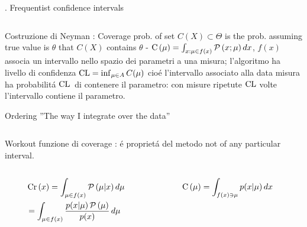\documentclass[asd-beamer.tex]{subfiles}%
\begin{document}
\begin{frame}{. Frequentist confidence intervals}
\begin{columns}[T]
\begin{column}{0.6\textwidth}
	\begin{block}{Costruzione di Neyman}
		: Coverage prob. of set $C(X)\subset\Theta$ is the prob. assuming true value is $\theta$ that $C(X)$ contains $\theta$ - $\operatorname{C}{(\mu)}=\int_{x:\mu\in f(x)}\operatorname{\mathcal{P}}{(x;\mu)}\,dx$, $f(x)$ associa un intervallo nello spazio dei parametri a una misura; l'algoritmo ha livello di confidenza $\operatorname{CL}=\inf_{\mu\in A}C(\mu)$ cio\'e l'intervallo associato alla data misura ha probabilit\'a $\operatorname{CL}{}$ di contenere il parametro: con misure ripetute $\operatorname{CL}$ volte l'intervallo contiene il parametro.
	\end{block}
	\begin{block}{Ordering}
		''The way I integrate over the data''
	\end{block}
\end{column}
\end{columns}
\end{frame}

\begin{wordonframe}{Workout funzione di coverage}
: \'e propriet\'a del metodo not of any particular interval.
\begin{columns}[T]
    \begin{column}{0.5\textwidth}
        \begin{align*}
            &\operatorname{Cr}{(x)}=\int_{\mu\in f(x)}\operatorname{\mathcal{P}}{(\mu|x)}\,d\mu\\
            &=\int_{\mu\in f(x)}\frac{p(x|\mu)\operatorname{\mathcal{P}}{(\mu)}}{p(x)}\,d\mu
        \end{align*}
    \end{column}
    \begin{column}{0.5\textwidth}
        \begin{align*}
            &\operatorname{C}{(\mu)}=\int_{f(x)\ni\mu}p(x|\mu)\,dx
        \end{align*}
    \end{column}
\end{columns}
\end{wordonframe}
\end{document}
